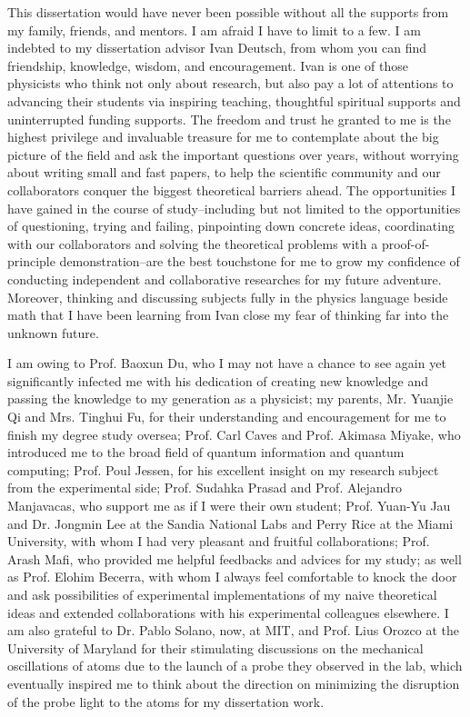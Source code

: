 \begin{acknowledgments}
\noindent This dissertation would have never been possible without all the supports from my family, friends, and mentors. 
I am afraid I have to limit to a few. 
I am indebted to my dissertation advisor Ivan Deutsch, from whom you can find friendship, knowledge, wisdom, and encouragement.  
Ivan is one of those physicists who think not only about research, but also pay a lot of attentions to advancing their students via inspiring teaching, thoughtful spiritual supports and uninterrupted funding supports. 
The freedom and trust he granted to me is the highest privilege and invaluable treasure for me to contemplate about the big picture of the field and ask the important questions over years, without worrying about writing small and fast papers, to help the scientific community and our collaborators conquer the biggest theoretical barriers ahead. 
The opportunities I have gained in the course of study--including but not limited to the opportunities of questioning, trying and failing, pinpointing down concrete ideas, coordinating with our collaborators and solving the theoretical problems with a proof-of-principle demonstration--are the best touchstone for me to grow my confidence of conducting independent and collaborative researches for my future adventure. 
Moreover, thinking and discussing subjects fully in the physics language beside math that I have been learning from Ivan close my fear of thinking far into the unknown future. 

I am owing to Prof. Baoxun Du, who I may not have a chance to see again yet significantly infected me with his dedication of creating new knowledge and passing the knowledge to my generation as a physicist; 
my parents, Mr. Yuanjie Qi and Mrs. Tinghui Fu, for their understanding and encouragement for me to finish my degree study oversea; Prof. Carl Caves and Prof. Akimasa Miyake, who introduced me to the broad field of quantum information and quantum computing; 
Prof. Poul Jessen, for his excellent insight on my research subject from the experimental side; 
Prof. Sudahka Prasad and Prof. Alejandro Manjavacas, who support me as if I were their own student; 
Prof. Yuan-Yu Jau and Dr. Jongmin Lee at the Sandia National Labs and Perry Rice at the Miami University, with whom I had very pleasant and fruitful collaborations; Prof. 
Arash Mafi, who provided me helpful feedbacks and advices for my study; 
as well as Prof. Elohim Becerra, with whom I always feel comfortable to knock the door and ask possibilities of experimental implementations of my naive theoretical ideas and extended collaborations with his experimental colleagues elsewhere. I am also grateful to Dr. Pablo Solano, now, at MIT, and Prof. Lius Orozco at the University of Maryland for their stimulating discussions on the mechanical oscillations of atoms due to the launch of a probe they observed in the lab, which eventually inspired me to think about the direction on minimizing the disruption of the probe light to the atoms for my dissertation work. 


\end{acknowledgments}
